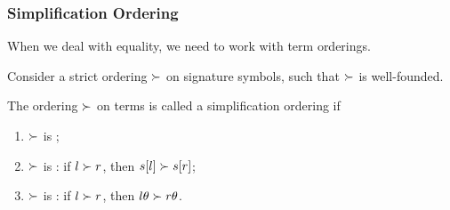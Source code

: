  

\begin{frame}
\frametitle{Simplification Ordering}


When we deal with equality, we need to work with \alert{term
  orderings}. 

Consider a strict ordering ${\succ}$ on signature symbols, such that
${\succ}$ is well-founded. 

\medskip

The ordering ${\succ}$ on terms is called a \alert{simplification ordering}
if

\begin{enumerate}
\item ${\succ}$ is ;
\item ${\succ}$ is : 
if ${l \succ r}$, then ${s[l] \succ s[r]}$;
\item ${\succ}$ is : 
if ${l \succ r}$, then ${l\theta \succ r\theta}$.
\end{enumerate}

\medskip 
{}
                                \end{frame}


